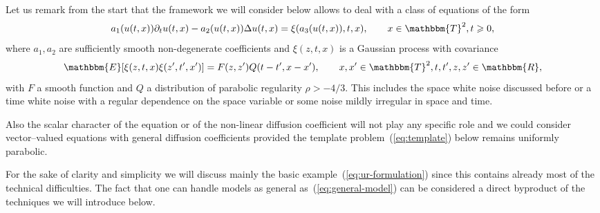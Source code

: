\documentclass[11pt,reqno]{amsart}
\begin{document}
Let us remark from the start that the framework we will consider below allows
to deal with a class of equations of the form
\begin{equation}
  a_1 (u (t, x)) \partial_t u (t, x) - a_2 (u (t, x)) \Delta u (t, x) = \xi
  (a_3 (u (t, x)), t, x), \qquad x \in \mathbbm{T}^2, t \geqslant 0,
  \label{eq:general-model}
\end{equation}
where $a_1, a_2$ are sufficiently smooth non-degenerate coefficients and $\xi
(z, t, x)$ is a Gaussian process with covariance
\[ \mathbbm{E} [\xi (z, t, x) \xi (z', t', x')] = F (z, z') Q (t - t', x -
   x'), \qquad x, x' \in \mathbbm{T}^2, t, t', z, z' \in \mathbbm{R}, \]
with $F$ a smooth function and $Q$ a distribution of parabolic regularity
$\rho > - 4 / 3$. This includes the space white noise discussed before or a
time white noise with a regular dependence on the space variable or some noise
mildly irregular in space and time.

Also the scalar character of the equation or of the non-linear diffusion
coefficient will not play any specific role and we could consider
vector--valued equations with general diffusion coefficients provided the
template problem~(\ref{eq:template}) below remains uniformly parabolic.

For the sake of clarity and simplicity we will discuss mainly the basic
example~(\ref{eq:ur-formulation}) since this contains already most of the
technical difficulties. The fact that one can handle models as general
as~(\ref{eq:general-model}) can be considered a direct byproduct of the
techniques we will introduce below.
\end{document}
